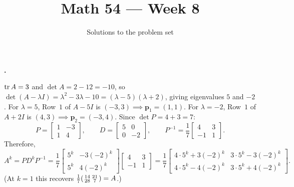 \documentclass[10pt]{scrartcl}
\title{Math 54 --- Week 8}
\subtitle{Solutions to the problem set}
\author{}\date{}\ihead{}
\newcommand{\vv}[1]{\mathbf{#1}}
\begin{document}
\maketitle

\begin{prob}\textbf{.}\par{}
\begin{steps}
  \ii $\operatorname{tr} A=3$ and $\det A=2-12=-10$, so $\det(A-\lambda I)=\lambda^2-3\lambda-10=(\lambda-5)(\lambda+2)$, giving eigenvalues $5$ and $-2$.
  \ii For $\lambda=5$, Row~$1$ of $A-5I$ is $(-3,3) \implies \vv p_1=(1,1)$. For $\lambda=-2$, Row~$1$ of $A+2I$ is $(4,3) \implies \vv p_2=(-3,4)$.
  \ii Since $\det P=4+3=7$:
  \[
    P=\begin{bmatrix}1&-3\\1&4\end{bmatrix},\qquad
    D=\begin{bmatrix}5&0\\0&-2\end{bmatrix},\qquad
    P^{-1}=\frac{1}{7}\begin{bmatrix}4&3\\-1&1\end{bmatrix}.
  \]
  \ii Therefore,
  \[
    A^k = PD^kP^{-1} = \frac{1}{7}\begin{bmatrix}5^k&-3(-2)^k\\5^k&4(-2)^k\end{bmatrix}\begin{bmatrix}4&3\\-1&1\end{bmatrix}
    = \frac{1}{7}\begin{bmatrix}4\cdot 5^k+3(-2)^k & 3\cdot 5^k-3(-2)^k\\ 4\cdot 5^k-4(-2)^k & 3\cdot 5^k+4(-2)^k\end{bmatrix}.
  \]
  (At $k=1$ this recovers $\frac{1}{7}\begin{psmallmatrix}14&21\\28&7\end{psmallmatrix}=A$.)
\end{steps}
\end{prob}
\end{document}

